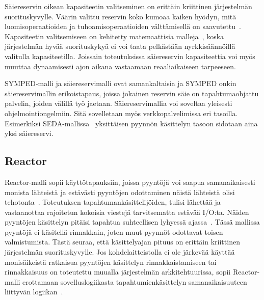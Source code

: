 \documentclass[finnish]{tktltiki2}%
\theoremstyle{definition}
\theoremstyle{remark}
\begin{document}
Säiereservin oikean kapasiteetin valitseminen on erittäin kriittinen
järjestelmän suorituskyvylle.
Väärin valittu reservin koko kumoaa kaiken hyödyn, mitä luomisoperaatioiden
ja tuhoamisoperaatioiden välttämisellä on saavutettu~\cite{ling_analysis_2000}.
Kapasiteetin valitsemiseen on kehitetty matemaattisia malleja~\cite{ling_analysis_2000},
koska järjestelmän hyvää suorituskykyä ei voi taata pelkästään nyrkkisäännöillä
valitulla kapasiteetilla.
Joissain toteutuksissa säiereservin kapasiteettia voi myös muuttaa dynaamisesti ajon aikana vastaamaan
reaaliaikaiseen tarpeeseen.

SYMPED-malli ja säiereservimalli ovat samankaltaisia ja SYMPED onkin
säiereservimallin erikoistapaus, joissa jokainen reservin säie on
tapahtumaohjattu palvelin,
joiden välillä työ jaetaan.
Säiereservimallia voi soveltaa yleisesti ohjelmointiongelmiin. Sitä
sovelletaan myös verkkopalvelimissa eri tasoilla. Esimerkiksi
SEDA-mallissa~\cite{welsh_seda_2001}
yksittäisen pyynnön käsittelyn tasoon sidotaan aina yksi säiereservi.

\subsection{Reactor}

Reactor-malli sopii käyttötapauksiin, joissa pyyntöjä voi saapua
samanaikaisesti monista lähteistä ja estävästi
pyyntöjen odottaminen näistä lähteistä olisi tehotonta~\cite{schmidt_reactor:_1995}.
Toteutuksen tapahtumankäsittelijöiden, tulisi
lähettää ja vastaanottaa rajoitetun kokoisia viestejä
tarvitsematta estävää I/O:ta.
Näiden pyyntöjen käsittelyn
pitäisi tapahtua suhteellisen lyhyessä ajassa~\cite{schmidt_reactor:_1995}.
Tässä mallissa pyyntöjä ei käsitellä rinnakkain, joten muut
pyynnöt odottavat toisen valmistumista.
Tästä seuraa, että käsittelyajan pituus on erittäin kriittinen järjestelmän
suorituskyvylle.
Jos kohdelaitteistolla ei ole järkevää käyttää monisäikeistä
ratkaisua pyyntöjen käsittelyn rinnakkaistamiseen tai rinnakkaisuus
on toteutettu muualla järjestelmän arkkitehtuurissa, sopii Reactor-malli
erottamaan sovelluslogiikasta tapahtumienkäsittelyn
samanaikaisuuteen liittyvän logiikan~\cite{schmidt_reactor:_1995}.
\end{document}
